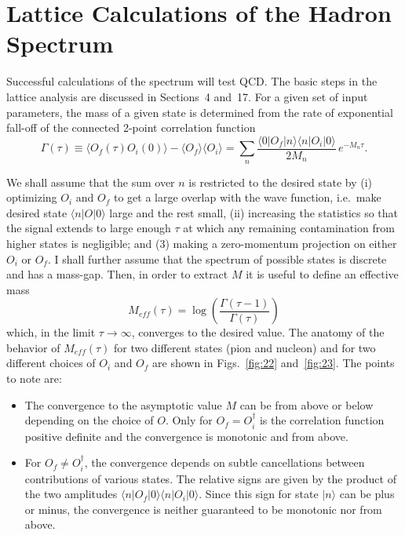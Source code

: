 
\chapter{Lattice Calculations of the Hadron Spectrum}

Successful calculations of the spectrum will test QCD. The basic steps in the lattice analysis are discussed in Sections~4 and~17. For a given set of input parameters, the mass of a given state is determined from the rate of exponential fall-off of the connected 2-point correlation function
\begin{equation}
\Gamma(\tau) \equiv \langle O_f(\tau) O_i(0) \rangle - \langle O_f \rangle \langle O_i \rangle
= \sum_n \frac{\langle 0 | O_f | n \rangle \langle n | O_i | 0 \rangle}{2 M_n}\, e^{-M_n \tau}.
\label{eq:2pt}
\end{equation}

We shall assume that the sum over $n$ is restricted to the desired state by (i) optimizing $O_i$ and $O_f$ to get a large overlap with the wave function, i.e.\ make desired state $\langle n | O | 0 \rangle$ large and the rest small, (ii) increasing the statistics so that the signal extends to large enough $\tau$ at which any remaining contamination from higher states is negligible; and (3) making a zero-momentum projection on either $O_i$ or $O_f$. I shall further assume that the spectrum of possible states is discrete and has a mass-gap. Then, in order to extract $M$ it is useful to define an effective mass
\begin{equation}
M_{eff}(\tau) = \log\!\left( \frac{\Gamma(\tau-1)}{\Gamma(\tau)} \right)
\label{eq:meff}
\end{equation}
which, in the limit $\tau \to \infty$, converges to the desired value. The anatomy of the behavior of $M_{eff}(\tau)$ for two different states (pion and nucleon) and for two different choices of $O_i$ and $O_f$ are shown in Figs.~\ref{fig:22} and~\ref{fig:23}. The points to note are:
\begin{itemize}
\item The convergence to the asymptotic value $M$ can be from above or below depending on the choice of $O$. Only for $O_f = O_i^\dagger$ is the correlation function positive definite and the convergence is monotonic and from above.
\item For $O_f \neq O_i^\dagger$, the convergence depends on subtle cancellations between contributions of various states. The relative signs are given by the product of the two amplitudes $\langle n | O_f | 0 \rangle \langle n | O_i | 0 \rangle$. Since this sign for state $|n\rangle$ can be plus or minus, the convergence is neither guaranteed to be monotonic nor from above.
\end{itemize}

